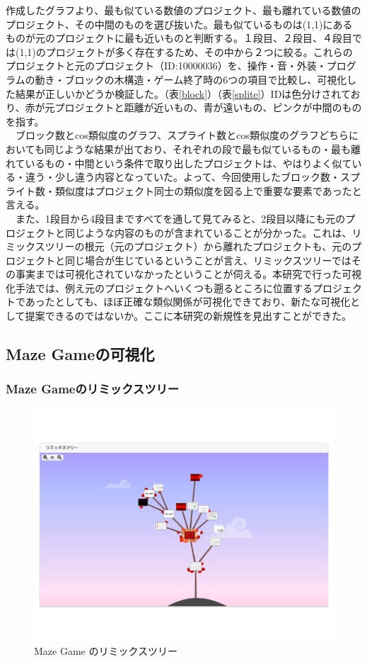 \documentclass[a4paper,10pt,onecolumn,oneside,openany]{jsbook}
\begin{document}
作成したグラフより、最も似ている数値のプロジェクト、最も離れている数値のプロジェクト、その中間のものを選び抜いた。最も似ているものは(1,1)にあるものが元のプロジェクトに最も近いものと判断する。１段目、２段目、４段目では(1,1)のプロジェクトが多く存在するため、その中から２つに絞る。これらのプロジェクトと元のプロジェクト（ID:10000036）を、操作・音・外装・プログラムの動き・ブロックの木構造・ゲーム終了時の6つの項目で比較し、可視化した結果が正しいかどうか検証した。（表\ref{block}）（表\ref{splite}）IDは色分けされており、赤が元プロジェクトと距離が近いもの、青が遠いもの、ピンクが中間のものを指す。
\\
　ブロック数とcos類似度のグラフ、スプライト数とcos類似度のグラフどちらにおいても同じような結果が出ており、それぞれの段で最も似ているもの・最も離れているもの・中間という条件で取り出したプロジェクトは、やはりよく似ている・違う・少し違う内容となっていた。よって、今回使用したブロック数・スプライト数・類似度はプロジェクト同士の類似度を図る上で重要な要素であったと言える。
\\
　また、1段目から4段目まですべてを通して見てみると、2段目以降にも元のプロジェクトと同じような内容のものが含まれていることが分かった。これは、リミックスツリーの根元（元のプロジェクト）から離れたプロジェクトも、元のプロジェクトと同じ場合が生じているということが言え、リミックスツリーではその事実までは可視化されていなかったということが伺える。本研究で行った可視化手法では、例え元のプロジェクトへいくつも遡るところに位置するプロジェクトであったとしても、ほぼ正確な類似関係が可視化できており、新たな可視化として提案できるのではないか。ここに本研究の新規性を見出すことができた。

\newpage
\subsection{Maze Gameの可視化}
\subsubsection{Maze Gameのリミックスツリー}
\begin{figure}[ht]
  \centering
    \includegraphics[scale=0.5]{mazegameremix.pdf}
  \caption{Maze Game のリミックスツリー}
  \label{mgrt}
 \end{figure}
\end{document}
